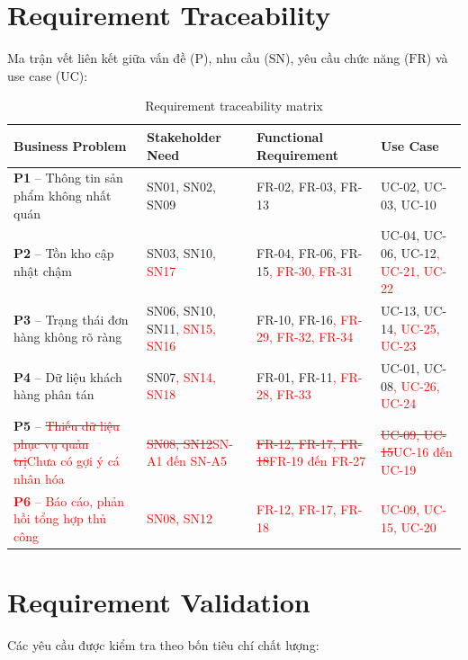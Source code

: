 \documentclass[12pt,a4paper,oneside]{report}
\newif\ifmark \marktrue
\newcommand{\chg}[1]{\ifmark\textcolor{red}{#1}\else #1\fi}
\newcommand{\del}[1]{\ifmark\textcolor{red}{\sout{#1}}\fi}
\begin{document}
\section{Requirement Traceability}

Ma trận vết liên kết giữa vấn đề ($\text{P}$), nhu cầu ($\text{SN}$), yêu cầu chức năng ($\text{FR}$) và use case ($\text{UC}$):

\begin{longtable}{p{4.4cm}p{3.2cm}p{4.2cm}p{4.2cm}}
\caption{Requirement traceability matrix}\\
\toprule
\textbf{Business Problem} & \textbf{Stakeholder Need} & \textbf{Functional Requirement} & \textbf{Use Case} \\
\midrule
\endhead
\bottomrule
\endlastfoot
\textbf{P1} -- Thông tin sản phẩm không nhất quán & SN01, SN02, SN09 & FR-02, FR-03, FR-13 & UC-02, UC-03, UC-10 \\
\textbf{P2} -- Tồn kho cập nhật chậm & SN03, SN10\chg{, SN17} & FR-04, FR-06, FR-15\chg{, FR-30, FR-31} & UC-04, UC-06, UC-12\chg{, UC-21, UC-22} \\
\textbf{P3} -- Trạng thái đơn hàng không rõ ràng & SN06, SN10, SN11\chg{, SN15, SN16} & FR-10, FR-16\chg{, FR-29, FR-32, FR-34} & UC-13, UC-14\chg{, UC-25, UC-23} \\
\textbf{P4} -- Dữ liệu khách hàng phân tán & SN07\chg{, SN14, SN18} & FR-01, FR-11\chg{, FR-28, FR-33} & UC-01, UC-08\chg{, UC-26, UC-24} \\
\textbf{P5} -- \del{Thiếu dữ liệu phục vụ quản trị}\chg{Chưa có gợi ý cá nhân hóa} & \del{SN08, SN12}\chg{SN-A1 đến SN-A5} & \del{FR-12, FR-17, FR-18}\chg{FR-19 đến FR-27} & \del{UC-09, UC-15}\chg{UC-16 đến UC-19} \\
\chg{\textbf{P6} -- Báo cáo, phản hồi tổng hợp thủ công} & \chg{SN08, SN12} & \chg{FR-12, FR-17, FR-18} & \chg{UC-09, UC-15, UC-20} \\
\end{longtable}

\section{Requirement Validation}

Các yêu cầu được kiểm tra theo bốn tiêu chí chất lượng:
\end{document}
